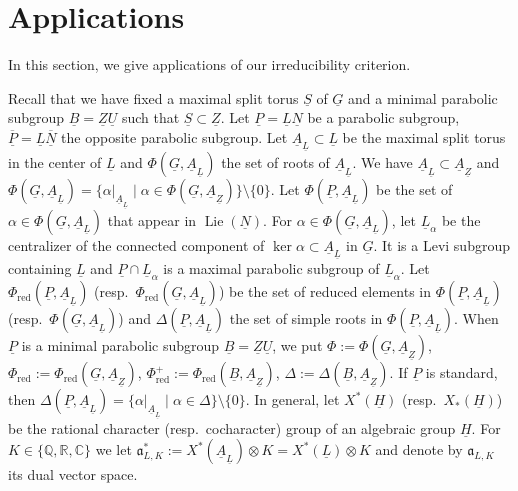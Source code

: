 \documentclass[a4paper]{amsart}
\numberwithin{equation}{section}
\theoremstyle{remark}
\theoremstyle{definition}
\DeclareMathOperator{\Lie}{Lie}
\newcommand{\C}{\mathbb{C}}
\newcommand{\Q}{\mathbb{Q}}
\newcommand{\R}{\mathbb{R}}
\newcommand{\alggrp}[1]{\underline{#1}}
\newcommand{\red}{\mathrm{red}}
\begin{document}
\section{Applications}
\label{sec:applications}
In this section, we give applications of our irreducibility criterion.


Recall that we have fixed a maximal split torus $\alggrp{S}$ of $\alggrp{G}$ and a minimal parabolic subgroup $\alggrp{B} = \alggrp{Z}\alggrp{U}$ such that $\alggrp{S}\subset \alggrp{Z}$.
Let $\alggrp{P} = \alggrp{L}\alggrp{N}$ be a parabolic subgroup, $\overline{\alggrp{P}} = \alggrp{L}\overline{\alggrp{N}}$ the opposite parabolic subgroup.
Let $\alggrp{A}_{\alggrp{L}}\subset \alggrp{L}$ be the maximal split torus in the center of $\alggrp L$ and $\Phi(\alggrp{G},\alggrp{A}_{\alggrp{L}})$ the set of roots of $\alggrp A_{\alggrp L}$.
We have $\alggrp{A}_{\alggrp{L}}\subset \alggrp{A}_{\alggrp{Z}}$ and $\Phi(\alggrp{G},\alggrp{A}_{\alggrp{L}}) = \{\alpha|_{\alggrp A_{\alggrp L}}\mid \alpha\in \Phi(\alggrp{G},\alggrp{A}_{\alggrp{Z}})\}\setminus\{0\}$.
Let $\Phi(\alggrp{P},\alggrp{A}_{\alggrp{L}})$ be the set of $\alpha\in\Phi(\alggrp{G},\alggrp{A}_{\alggrp{L}})$ that appear in $\Lie(\alggrp N)$.
For $\alpha\in\Phi(\alggrp{G},\alggrp{A}_{\alggrp{L}})$, let $\alggrp{L}_{\alpha}$ be the centralizer of the connected component of $\ker\alpha\subset \alggrp{A}_{\alggrp{L}}$ in $\alggrp{G}$.
It is a Levi subgroup containing $\alggrp{L}$ and $\alggrp{P}\cap \alggrp{L}_{\alpha}$ is a maximal parabolic subgroup of $\alggrp{L}_{\alpha}$.
Let $\Phi_{\red}(\alggrp{P},\alggrp{A}_{\alggrp{L}})$ (resp.\ $\Phi_{\red}(\alggrp{G},\alggrp{A}_{\alggrp{L}})$) be the set of reduced elements in $\Phi(\alggrp{P},\alggrp{A}_{\alggrp{L}})$ (resp.\ $\Phi(\alggrp{G},\alggrp{A}_{\alggrp{L}})$) and $\Delta(\alggrp{P},\alggrp{A}_{\alggrp{L}})$ the set of simple roots in $\Phi(\alggrp{P},\alggrp{A}_{\alggrp{L}})$.
When $\alggrp{P}$ is a minimal parabolic subgroup $\alggrp{B} = \alggrp{Z}\alggrp{U}$, we put $\Phi := \Phi(\alggrp{G},\alggrp{A}_{\alggrp{Z}})$, $\Phi_{\red} := \Phi_{\red}(\alggrp{G},\alggrp{A}_{\alggrp{Z}})$, $\Phi^+_{\red} := \Phi_{\red}(\alggrp{B},\alggrp{A}_{\alggrp{Z}})$, $\Delta := \Delta(\alggrp{B},\alggrp{A}_{\alggrp{Z}})$.
If $\alggrp{P}$ is standard, then $\Delta(\alggrp{P},\alggrp{A}_{\alggrp{L}}) = \{\alpha|_{\alggrp{A}_{\alggrp{L}}}\mid \alpha\in \Delta\}\setminus\{0\}$.
In general, let $X^{*}(\alggrp{H})$ (resp.\ $X_{*}(\alggrp{H})$) be the rational character (resp.\ cocharacter) group of an algebraic group $\alggrp{H}$.
For $K \in \{\Q,\R,\C\}$ we let $\mathfrak{a}_{L,K}^* := X^*(\alggrp{A}_{\alggrp{L}}) \otimes K = X^*(\alggrp{L}) \otimes K$ and denote by $\mathfrak{a}_{L,K}$ its dual vector space.
\end{document}
